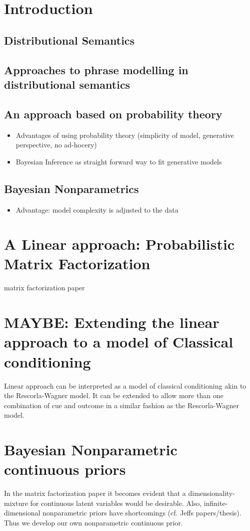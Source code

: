 \chapter{Introduction}

\section{Distributional Semantics}
\section{Approaches to phrase modelling in distributional semantics}
\section{An approach based on probability theory}
\begin{itemize}
	\item Advantages of using probability theory (simplicity of model, generative perspective, no ad-hocery)
	\item Bayesian Inference as straight forward way to fit generative models
\end{itemize}
\section{Bayesian Nonparametrics}
\begin{itemize}
	\item Advantage: model complexity is adjusted to the data
\end{itemize}

\chapter{A Linear approach: Probabilistic Matrix Factorization}
matrix factorization paper

\chapter{MAYBE: Extending the linear approach to a model of Classical conditioning}
Linear approach can be interpreted as a model of classical conditioning akin to the Rescorla-Wagner model. It can be extended to allow more than one combination of cue and outcome in a similar fashion as the Rescorla-Wagner model.

\chapter{Bayesian Nonparametric continuous priors}
In the matrix factorization paper it becomes evident that a dimensionality-mixture for continuous latent variables would be desirable. Also, infinite-dimensional nonparametric priors have shortcomings (cf. Jeffs papers/thesis). Thus we develop our own nonparametric continuous prior.

